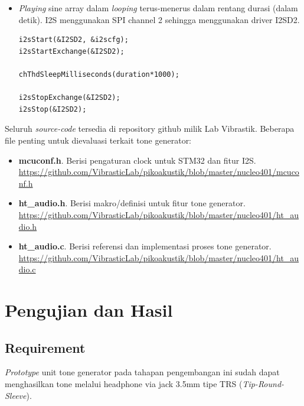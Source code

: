\documentclass[12pt,]{article}
\begin{document}
\begin{itemize}
		\item \textit{Playing} sine array dalam \textit{looping}
		terus-menerus dalam rentang durasi (dalam detik).
		I2S menggunakan SPI channel 2 sehingga menggunakan driver I2SD2.
		\begin{verbatim}
i2sStart(&I2SD2, &i2scfg);
i2sStartExchange(&I2SD2);

chThdSleepMilliseconds(duration*1000);

i2sStopExchange(&I2SD2);
i2sStop(&I2SD2);
		\end{verbatim}
	\end{itemize}

	Seluruh \textit{source-code} tersedia di repository github milik Lab Vibrastik.
	Beberapa file penting untuk dievaluasi terkait tone generator:
	
	\begin{itemize}
		\item \textbf{mcuconf.h}. Berisi pengaturan clock untuk STM32 dan fitur I2S.\\
		\url{https://github.com/VibrasticLab/pikoakustik/blob/master/nucleo401/mcuconf.h}
		
		\item \textbf{ht\_audio.h}. Berisi makro/definisi untuk fitur tone generator.\\
		\url{https://github.com/VibrasticLab/pikoakustik/blob/master/nucleo401/ht_audio.h}
		
		\item \textbf{ht\_audio.c}. Berisi referensi dan implementasi proses tone generator.\\
		\url{https://github.com/VibrasticLab/pikoakustik/blob/master/nucleo401/ht_audio.c}
	\end{itemize}

	\newpage
	\section{Pengujian dan Hasil}
	
	\subsection{Requirement}
	\textit{Prototype} unit tone generator pada tahapan pengembangan ini sudah dapat
	menghasilkan tone melalui headphone via jack 3.5mm tipe TRS (\textit{Tip-Round-Sleeve}). 
	
\end{document}
